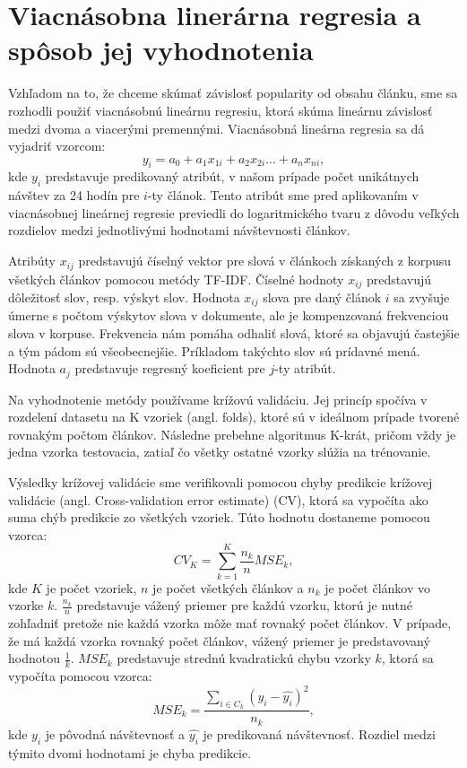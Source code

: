 \documentclass[runningheads,a4paper]{llncs}
\begin{document}
\section{Viacnásobna linerárna regresia a spôsob jej vyhodnotenia}
Vzhľadom na to, že chceme skúmať závislosť popularity od obsahu článku, sme sa rozhodli použiť viacnásobnú lineárnu regresiu, ktorá skúma lineárnu závislosť medzi dvoma a viacerými premennými. Viacnásobná lineárna regresia sa dá vyjadriť vzorcom: 
\begin{displaymath}
y_i = a_0 + a_1x_{1i} +  a_2x_{2i} \ldots + a_nx_{ni},
\end{displaymath}
kde $y_{i}$ predstavuje predikovaný atribút, v našom prípade počet unikátnych návštev za 24 hodín pre $i$-ty článok. Tento atribút sme pred aplikovaním v viacnásobnej lineárnej regresie previedli do logaritmického tvaru z dôvodu veľkých rozdielov medzi jednotlivými hodnotami návštevnosti článkov.

Atribúty $x_{ij}$ predstavujú číselný vektor pre slová v článkoch získaných z korpusu všetkých článkov pomocou metódy TF-IDF. Číselné hodnoty $x_{ij}$ predstavujú dôležitosť slov, resp. výskyt slov. Hodnota $x_{ij}$ slova pre daný článok $i$ sa zvyšuje úmerne s počtom výskytov slova v dokumente, ale je kompenzovaná frekvenciou slova v korpuse. Frekvencia nám pomáha odhaliť slová, ktoré sa objavujú častejšie a tým pádom sú všeobecnejšie. Príkladom takýchto slov sú prídavné mená. Hodnota $a_j$ predstavuje regresný koeficient pre $j$-ty atribút.

Na vyhodnotenie metódy používame krížovú validáciu. Jej princíp spočíva v rozdelení datasetu na K vzoriek (angl. folds), ktoré sú v ideálnom prípade tvorené rovnakým počtom článkov. Následne prebehne algoritmus K-krát, pričom vždy je jedna vzorka testovacia, zatiaľ čo všetky ostatné vzorky slúžia na trénovanie.

Výsledky krížovej validácie sme verifikovali pomocou chyby predikcie krížovej validácie (angl. Cross-validation error estimate) (CV), ktorá sa vypočíta ako suma chýb predikcie zo všetkých vzoriek. Túto hodnotu dostaneme pomocou vzorca: 
\begin{displaymath}
CV_K = \sum_{k=1}^K \frac{n_k}{n} MSE_k,
\end{displaymath}
kde $K$ je počet vzoriek, $n$ je počet všetkých článkov a $n_k$ je počet článkov vo vzorke $k$. $\frac{n_k}{n}$ predstavuje vážený priemer pre každú vzorku, ktorú je nutné zohľadniť pretože nie každá vzorka môže mať rovnaký počet článkov. V prípade, že má každá vzorka rovnaký počet článkov, vážený priemer je predstavovaný hodnotou $\frac{1}{k}$. $MSE_k$ predstavuje strednú kvadratickú chybu vzorky $k$, ktorá sa vypočíta pomocou vzorca:
\begin{displaymath}
MSE_k = \frac{\sum_{i \in C_k}(y_i-\hat{y_i})^2}{n_k},
\end{displaymath}
kde $y_i$ je pôvodná návštevnosť a $\hat{y_i}$ je predikovaná návštevnosť. Rozdiel medzi týmito dvomi hodnotami je chyba predikcie.
\end{document}
